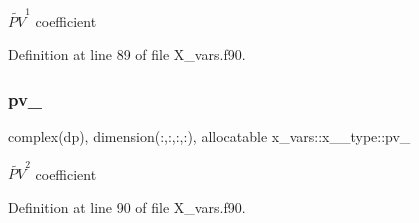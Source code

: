 $\widetilde{PV}^1$ coefficient 



Definition at line 89 of file X\+\_\+vars.\+f90.

\mbox{\label{structx__vars_1_1x__2__type_a02ca37a3af02f70acbc536d20a70bd0e}} 
\subsubsection{\texorpdfstring{pv\+\_}{pv\_2}}
{\footnotesize\ttfamily complex(dp), dimension(\+:,\+:,\+:,\+:), allocatable x\+\_\+vars\+::x\+\_\+\_\+type\+::pv\+\_}



$\widetilde{PV}^2$ coefficient 



Definition at line 90 of file X\+\_\+vars.\+f90.




